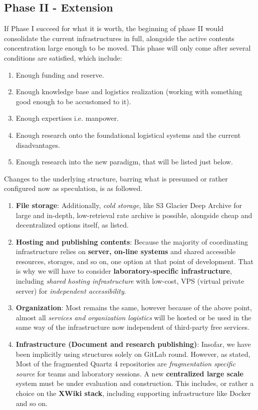 \documentclass[10pt,a4paper]{article}
\begin{document}
\subsection{Phase II - Extension}

If Phase I succeed for what it is worth, the beginning of phase II would consolidate the current infrastructures in full, alongside the active contents concentration large enough to be moved. This phase will only come after several conditions are satisfied, which include:
\begin{enumerate}
    \item Enough funding and reserve. 
    \item Enough knowledge base and logistics realization (working with something good enough to be accustomed to it). 
    \item Enough expertises i.e. manpower. 
    \item Enough research onto the foundational logistical systems and the current disadvantages. 
    \item Enough research into the new paradigm, that will be listed just below. 
\end{enumerate}

Changes to the underlying structure, barring what is presumed or rather configured now as speculation, is as followed. 
\begin{enumerate}
    \item \textbf{File storage}: Additionally, \textit{cold storage}, like S3 Glacier Deep Archive for large and in-depth, low-retrieval rate archive is possible, alongside cheap and decentralized options itself, as listed. 
    \item \textbf{Hosting and publishing contents}: Because the majority of coordinating infrastructure relies on \textbf{server, on-line systems} and shared accessible resources, storages, and so on, one option at that point of development. That is why we will have to consider \textbf{laboratory-specific infrastructure}, including \textit{shared hosting infrastructure} with low-cost, VPS (virtual private server) for \textit{independent accessibility}.
    \item \textbf{Organization}: Most remains the same, however because of the above point, almost all \textit{services and organization logistics} will be hosted or be used in the same way of the infrastructure now independent of third-party free services. 
    \item \textbf{Infrastructure (Document and research publishing)}: Insofar, we have been implicitly using structures solely on GitLab round. However, as stated, Most of the fragmented Quartz 4 repositories are \textit{fragmentation specific source} for teams and laboratory sessions. A new \textbf{centralized large scale} system must be under evaluation and construction. This includes, or rather a choice on the \textbf{XWiki stack}, including supporting infrastructure like Docker and so on. 
\end{enumerate}
\end{document}
